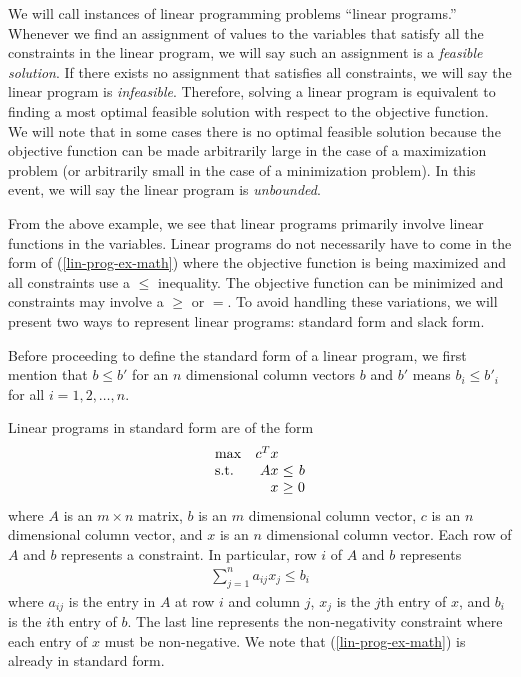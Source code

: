 \documentclass{article}
\begin{document}
We will call instances of linear programming problems ``linear programs.'' Whenever we find an assignment of values to the variables that satisfy all the constraints in the linear program, we will say such an assignment is a \textit{feasible solution}. If there exists no assignment that satisfies all constraints, we will say the linear program is \textit{infeasible}. Therefore, solving a linear program is equivalent to finding a most optimal feasible solution with respect to the objective function. We will note that in some cases there is no optimal feasible solution because the objective function can be made arbitrarily large in the case of a maximization problem (or arbitrarily small in the case of a minimization problem). In this event, we will say the linear program is \textit{unbounded}.

From the above example, we see that linear programs primarily involve linear functions in the variables. Linear programs do not necessarily have to come in the form of (\ref{lin-prog-ex-math}) where the objective function is being maximized and all constraints use a $\leq$ inequality. The objective function can be minimized and constraints may involve a $\geq$ or $=$. To avoid handling these variations, we will present two ways to represent linear programs: standard form and slack form. 

Before proceeding to define the standard form of a linear program, we first mention that $b \leq b'$ for an $n$ dimensional column vectors $b$ and $b'$ means $b_i \leq b'_i$ for all $i = 1, 2, \ldots, n$.

Linear programs in standard form are of the form
\begin{equation*}
\setlength\arraycolsep{1.5pt}
  \begin{array}{l@{\quad} r c r} 
    \max          & c^{T}x & & \\
    \mathrm{s.t.} &  Ax & \leq & b \\
                  & x & \geq &  0 \\
  \end{array}
\end{equation*}
where $A$ is an $m \times n$ matrix, $b$ is an $m$ dimensional column vector, $c$ is an $n$ dimensional column vector, and $x$ is an $n$ dimensional column vector. Each row of $A$ and $b$ represents a constraint. In particular, row $i$ of $A$ and $b$ represents
\begin{align*}
    \sum_{j = 1}^n a_{ij} x_j \leq b_i 
\end{align*}
where $a_{ij}$ is the entry in $A$ at row $i$ and column $j$, $x_j$ is the $j$th entry of $x$, and $b_i$ is the $i$th entry of $b$. The last line represents the non-negativity constraint where each entry of $x$ must be non-negative. We note that (\ref{lin-prog-ex-math}) is already in standard form.
\end{document}
